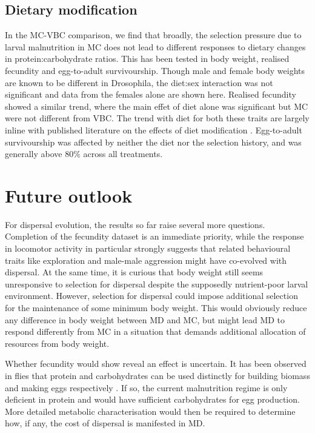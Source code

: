 \documentclass[12pt,onecolumn,twoside]{article}
\begin{document}
	\subsection{Dietary modification}
	In the MC-VBC comparison, we find that broadly, the selection pressure due to larval malnutrition in MC does not lead to different responses to dietary changes in protein:carbohydrate ratios. This has been tested in body weight, realised fecundity and egg-to-adult survivourship. Though male and female body weights are known to be different in Drosophila, the diet:sex interaction was not significant and data from the females alone are shown here. Realised fecundity showed a similar trend, where the main effet of diet alone was significant but MC were not different from VBC. The trend with diet for both these traits are largely inline with published literature on the effects of diet modification \citep{Lee2008}. Egg-to-adult survivourship was affected by neither the diet nor the selection history, and was generally above 80\% across all treatments.

	\section{Future outlook}
	For dispersal evolution, the results so far raise several more questions. Completion of the fecundity dataset is an immediate priority, while the response in locomotor activity in particular strongly suggests that related behavioural traits like exploration and male-male aggression might have co-evolved with dispersal. At the same time, it is curious that body weight still seems unresponsive to selection for dispersal despite the supposedly nutrient-poor larval environment. However, selection for dispersal could impose additional selection for the maintenance of some minimum body weight. This would obviously reduce any difference in body weight between MD and MC, but might lead MD to respond differently from MC in a situation that demands additional allocation of resources from body weight.

	Whether fecundity would show reveal an effect is uncertain. It has been observed in flies that protein and carbohydrates can be used distinctly for building biomass and making eggs respectively \cite{Ahmad2018, Mirth2019}. If so, the current malnutrition regime is only deficient in protein and would have sufficient carbohydrates for egg production. More detailed metabolic characterisation would then be required to determine how, if any, the cost of dispersal is manifested in MD.
\end{document}
